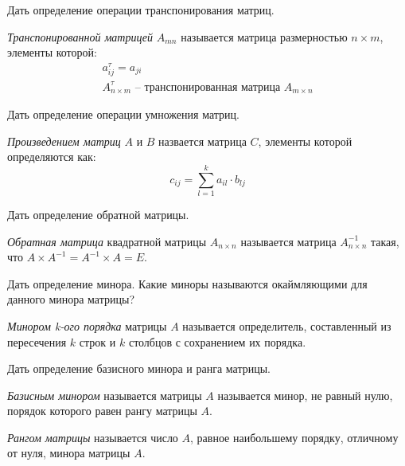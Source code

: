 \begin{question}
  Дать определение операции транспонирования матриц.
\end{question} 
\begin{answer}
  \textit{Транспонированной матрицей} $A_{mn}$ называется матрица размерностью $n \times  m$, элементы которой:
  \begin{gather*}
    a^\tau_{ij} = a_{ji} \\
    A_{n \times m}^\tau \text{ -- транспонированная матрица } A_{m \times n}
  \end{gather*}
\end{answer} 

\begin{question}
  Дать определение операции умножения матриц.
\end{question} 
\begin{answer}
    \textit{Произведением матриц} $A$ и $B$ назвается матрица $C$, элементы которой определяются как: \[
    c_{ij} = \sum_{l=1}^{k} a_{il} \cdot b_{lj}
  \] 
\end{answer} 

\begin{question}
  Дать определение обратной матрицы.
\end{question} 
\begin{answer}
  \textit{Обратная матрица} квадратной матрицы $A_{n \times n}$ называется матрица $A^{-1}_{n \times n}$ такая, что $A \times A^{-1} = A^{-1} \times A = E$.
\end{answer} 

\begin{question}
  Дать определение минора. Какие миноры называются окаймляющими для данного минора матрицы?
\end{question} 
\begin{answer}
  \textit{Минором k-ого порядка} матрицы $A$ называется определитель, составленный из пересечения $k$ строк и $k$ столбцов с сохранением их порядка.
\end{answer} 

\begin{question}
  Дать определение базисного минора и ранга матрицы.
\end{question} 
\begin{answer}
  \textit{Базисным минором} называется матрицы $A$ называется минор, не равный нулю, порядок которого равен рангу матрицы $A$.

  \textit{Рангом матрицы} называется число $A$, равное наибольшему порядку, отличному от нуля, минора матрицы $A$.
\end{answer} 

